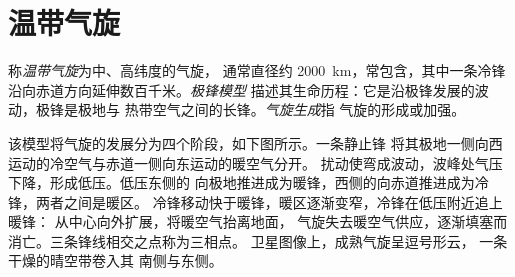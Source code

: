 \section{温带气旋}\label{sec:b2:weather-systems:cyclones}

\begin{definition}\label{def:b2:weather-systems:cyclones}
称\emph{温带气旋}为中、高纬度的气旋，
通常直径约 \qty{2000}{km}，常包含，其中一条冷锋
沿向赤道方向延伸数百千米。\emph{极锋模型}
描述其生命历程：它是沿极锋发展的波动，极锋是极地与
热带空气之间的长锋。\emph{气旋生成}指
气旋的形成或加强。
\end{definition}

该模型将气旋的发展分为四个阶段，如下图所示。一条静止锋
将其极地一侧向西运动的冷空气与赤道一侧向东运动的暖空气分开。
扰动使弯成波动，波峰处气压下降，形成低压。低压东侧的
向极地推进成为暖锋，西侧的向赤道推进成为冷锋，两者之间是暖区。
冷锋移动快于暖锋，暖区逐渐变窄，冷锋在低压附近追上暖锋：
从中心向外扩展，将暖空气抬离地面，
气旋失去暖空气供应，逐渐填塞而消亡。三条锋线相交之点称为三相点。
卫星图像上，成熟气旋呈逗号形云，
一条干燥的晴空带卷入其
南侧与东侧。

